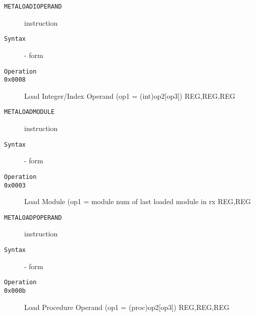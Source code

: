\clearpage
\begin{description}
\item[\texttt{METALOADIOPERAND}] instruction\\
\item[\texttt{Syntax}] - form \\

\item[\texttt{Operation}]
\item[\texttt{}]
\item[\texttt{0x0008}]       Load Integer/Index Operand (op1 = (int)op2[op3])  {REG,REG,REG} \\
\end{description}
\clearpage
\begin{description}
\item[\texttt{METALOADMODULE}] instruction\\
\item[\texttt{Syntax}] - form \\

\item[\texttt{Operation}]
\item[\texttt{}]
\item[\texttt{0x0003}]     Load Module (op1 = module num of last loaded module in rx  {REG,REG}       \\
\end{description}
\clearpage
\begin{description}
\item[\texttt{METALOADPOPERAND}] instruction\\
\item[\texttt{Syntax}] - form \\

\item[\texttt{Operation}]
\item[\texttt{}]
\item[\texttt{0x000b}]       Load Procedure Operand (op1 = (proc)op2[op3])  {REG,REG,REG} \\
\end{description}
